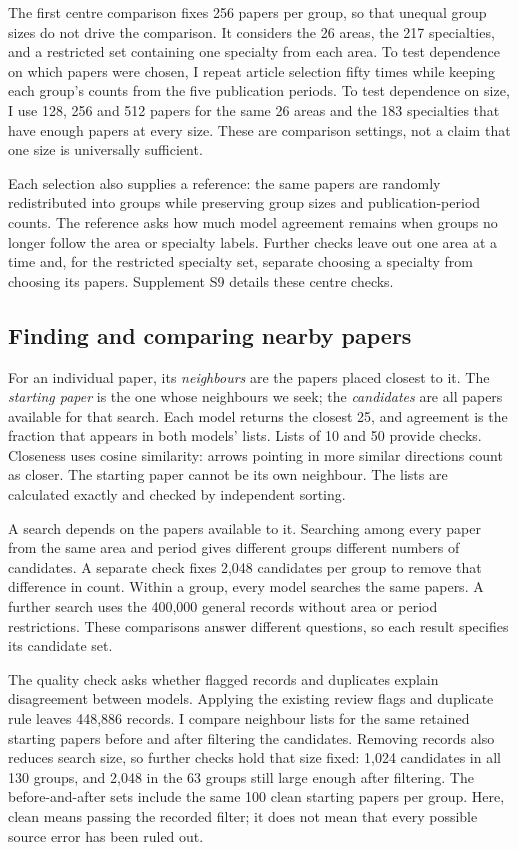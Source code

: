 \documentclass[12pt]{article}
\begin{document}
The first centre comparison fixes 256 papers per group, so that unequal group sizes do not drive the comparison. It considers the 26 areas, the 217 specialties, and a restricted set containing one specialty from each area. To test dependence on which papers were chosen, I repeat article selection fifty times while keeping each group's counts from the five publication periods. To test dependence on size, I use 128, 256 and 512 papers for the same 26 areas and the 183 specialties that have enough papers at every size. These are comparison settings, not a claim that one size is universally sufficient.

Each selection also supplies a reference: the same papers are randomly redistributed into groups while preserving group sizes and publication-period counts. The reference asks how much model agreement remains when groups no longer follow the area or specialty labels. Further checks leave out one area at a time and, for the restricted specialty set, separate choosing a specialty from choosing its papers. Supplement S9 details these centre checks.

\subsection{Finding and comparing nearby papers}
For an individual paper, its \emph{neighbours} are the papers placed closest to it. The \emph{starting paper} is the one whose neighbours we seek; the \emph{candidates} are all papers available for that search. Each model returns the closest 25, and agreement is the fraction that appears in both models' lists. Lists of 10 and 50 provide checks. Closeness uses cosine similarity: arrows pointing in more similar directions count as closer. The starting paper cannot be its own neighbour. The lists are calculated exactly and checked by independent sorting.

A search depends on the papers available to it. Searching among every paper from the same area and period gives different groups different numbers of candidates. A separate check fixes 2,048 candidates per group to remove that difference in count. Within a group, every model searches the same papers. A further search uses the 400,000 general records without area or period restrictions. These comparisons answer different questions, so each result specifies its candidate set.

The quality check asks whether flagged records and duplicates explain disagreement between models. Applying the existing review flags and duplicate rule leaves 448,886 records. I compare neighbour lists for the same retained starting papers before and after filtering the candidates. Removing records also reduces search size, so further checks hold that size fixed: 1,024 candidates in all 130 groups, and 2,048 in the 63 groups still large enough after filtering. The before-and-after sets include the same 100 clean starting papers per group. Here, clean means passing the recorded filter; it does not mean that every possible source error has been ruled out.
\end{document}
